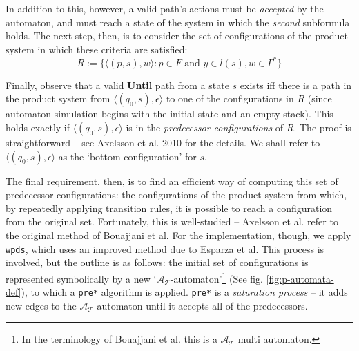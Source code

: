 \documentclass[11pt]{article}
\theoremstyle{definition}
\begin{document}
In addition to this, however, a valid path's actions must be \textit{accepted}
by the automaton, and must reach a state of the system in which the
\textit{second} subformula holds. The next step, then, is to consider the set
of configurations of the product system in which these criteria are satisfied:
\[
R := \{ \langle (p, s), w \rangle : p \in F \text{ and } y \in l(s), w \in \Gamma^*  \}\]

Finally, observe that a valid \textbf{Until} path from a state $s$ exists iff
there is a path in the product system from $\langle (q_0, s), \epsilon \rangle$
to one of the configurations in $R$ (since automaton simulation begins with the
initial state and an empty stack). This holds exactly if $\langle (q_0, s),
\epsilon \rangle$ is in the \textit{predecessor configurations} of $R$. The
proof is straightforward -- see Axelsson et al. 2010\cite{Kreutzer10} for the
details.  We shall refer to $\langle (q_0, s), \epsilon \rangle$ as the `bottom
configuration' for $s$.

The final requirement, then, is to find an efficient way of computing this set
of predecessor configurations: the configurations of the product system from
which, by repeatedly applying transition rules, it is possible to reach a
configuration from the original set. Fortunately, this is well-studied --
Axelsson et al. refer to the original method of Bouajjani et
al.\cite{bouajjani1997reachability} For the implementation, though, we apply
\texttt{wpds}, which uses an improved method due to Esparza et
al.\cite{EHRS00b}  This process is involved, but the outline is as follows:
the initial set of configurations is represented symbolically by a new
`$\mathcal{A_T}$-automaton'\footnote{In the terminology of Bouajjani et al. this
is a $\mathcal{A_T}$ multi automaton.} (See fig. \ref{fig:p-automata-def}), to which a \texttt{pre*} algorithm is
applied. \texttt{pre*} is a \textit{saturation process} -- it adds new edges to
the $\mathcal{A_T}$-automaton until it accepts all of the predecessors.
\end{document}
